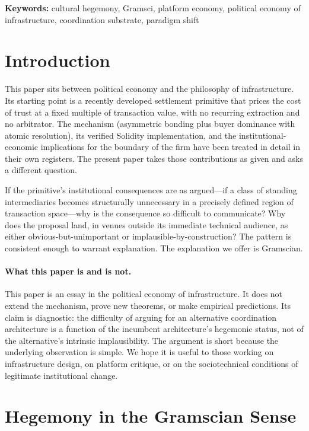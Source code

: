 \documentclass[11pt,a4paper]{article}
\theoremstyle{remark}
\begin{document}
\medskip
\noindent\textbf{Keywords:}
cultural hegemony, Gramsci, platform economy, political economy of
infrastructure, coordination substrate, paradigm shift

\section{Introduction}
\label{sec:intro}

This paper sits between political economy and the philosophy of
infrastructure. Its starting point is a recently developed
settlement primitive that prices the cost of trust at a fixed
multiple of transaction value, with no recurring extraction and no
arbitrator. The mechanism (asymmetric bonding plus buyer
dominance with atomic resolution), its verified Solidity
implementation, and the institutional-economic implications for
the boundary of the firm have been treated in detail in their
own registers. The present paper takes those contributions as
given and asks a different question.

If the primitive's institutional consequences are as
argued---if a class of standing intermediaries becomes
structurally unnecessary in a precisely defined region of
transaction space---why is the consequence so difficult to
communicate? Why does the proposal land, in venues outside its
immediate technical audience, as either obvious-but-unimportant or
implausible-by-construction? The pattern is consistent enough to
warrant explanation. The explanation we offer is Gramscian.

\paragraph{What this paper is and is not.}
This paper is an essay in the political economy of infrastructure.
It does not extend the mechanism, prove new theorems, or make
empirical predictions. Its claim is
diagnostic: the difficulty of arguing for an alternative
coordination architecture is a function of the incumbent
architecture's hegemonic status, not of the alternative's intrinsic
implausibility. The argument is short because the underlying
observation is simple. We hope it is useful to those working on
infrastructure design, on platform critique, or on the
sociotechnical conditions of legitimate institutional change.

\section{Hegemony in the Gramscian Sense}
\label{sec:gramsci}
\end{document}
